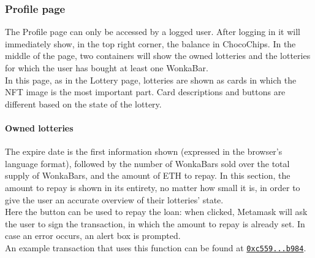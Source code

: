 \subsubsection{Profile page}
The Profile page can only be accessed by a logged user. After logging in it will immediately show, in the top right corner, the balance in ChocoChips. In the middle of the page, two containers will show the owned lotteries and the lotteries for which the user has bought at least one WonkaBar.\\
\indent In this page, as in the Lottery page, lotteries are shown as cards in which the NFT image is the most important part. Card descriptions and buttons are different based on the state of the lottery.

\paragraph{Owned lotteries} 
The expire date is the first information shown (expressed in the browser's language format), followed by the number of WonkaBars sold over the total supply of WonkaBars, and the amount of ETH to repay. In this section, the amount to repay is shown in its entirety, no matter how small it is, in order to give the user an accurate overview of their lotteries' state.\\
Here the button can be used to repay the loan: when clicked, Metamask will ask the user to sign the transaction, in which the amount to repay is already set. In case an error occurs, an alert box is prompted.\\
An example transaction that uses this function can be found at \href{https://goerli.etherscan.io/tx/0xc5594de7a71523fe548bad3646cd0cbb49d2c1fbdf3b361ba0cb37db3ff1b984}{\texttt{0xc559...b984}}.

